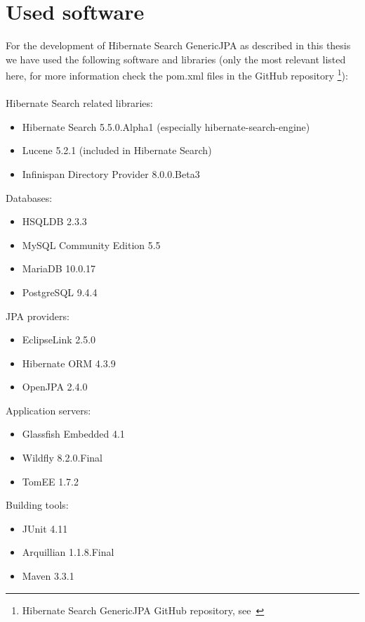 \section*{Used software}

For the development of Hibernate Search GenericJPA as described in this thesis we have used the following software and libraries (only the most relevant listed here, for more information check the pom.xml files in the GitHub repository \footnote{Hibernate Search GenericJPA GitHub repository, see~\cite{hibernate_genericjpa_github}}):
\\\\
\noindent
Hibernate Search related libraries:
\begin{itemize}
	\item Hibernate Search 5.5.0.Alpha1 (especially hibernate-search-engine)
	\item Lucene 5.2.1 (included in Hibernate Search)
	\item Infinispan Directory Provider 8.0.0.Beta3
\end{itemize}

\noindent
Databases:
\begin{itemize}
	\item HSQLDB 2.3.3
	\item MySQL Community Edition 5.5
	\item MariaDB 10.0.17
	\item PostgreSQL 9.4.4
\end{itemize}

\noindent
JPA providers:
\begin{itemize}
	\item EclipseLink 2.5.0
	\item Hibernate ORM 4.3.9
	\item OpenJPA 2.4.0
\end{itemize}

\noindent
Application servers:
\begin{itemize}
	\item Glassfish Embedded 4.1
	\item Wildfly 8.2.0.Final
	\item TomEE 1.7.2
\end{itemize}

\noindent
Building tools:
\begin{itemize}
	\item JUnit 4.11
	\item Arquillian 1.1.8.Final
	\item Maven 3.3.1
\end{itemize}

